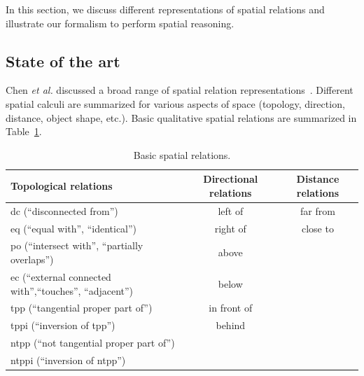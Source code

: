 \documentclass{article}
\begin{document}
 In this section, we discuss different representations of spatial relations and illustrate our formalism to perform spatial reasoning.

\subsection{State of the art}
Chen \textit{et al.} discussed a broad range of spatial relation representations~\cite{chen2013survey}. Different spatial calculi are summarized for various aspects of space 
(topology, direction, distance, object shape, etc.). Basic qualitative spatial relations are summarized in Table~\ref{tab:sr}.
\begin{center}
\begin{table}[h]
   \begin{tabular}{| l | c | c |}
    \hline
    Topological relations~\cite{randell1992spatial} & Directional relations & Distance relations \\ \hline
    dc (``disconnected from'') & left of & far from \\ 
    eq (``equal with'', ``identical'') & right of & close to \\
    po (``intersect with'', ``partially overlaps'') & above  &   \\
    ec (``external connected with'',``touches'', ``adjacent'') & below &  \\
    tpp (``tangential proper part of'') & in front of &  \\
    tppi (``inversion of tpp'') &  behind  &   \\
    ntpp (``not tangential proper part of'') &   &  \\
    ntppi (``inversion of ntpp'') &  &  \\
    \hline
  \end{tabular}
  \caption{Basic spatial relations.}
  \label{tab:sr}  
\end{table}
\end{center}
\end{document}
